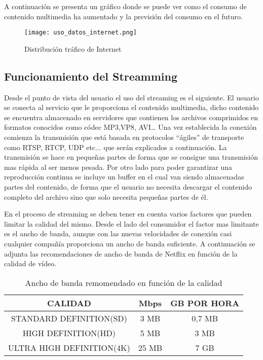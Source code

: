 A continuación se presenta un gráfico donde se puede ver como el consumo de contenido multimedia ha aumentado y la previsión del consumo en el futuro.

\begin{figure}[H]
    \centering
    \texttt{[image: uso\_datos\_internet.png]}
    \caption{Distribución tráfico de Internet}
\end{figure}

\subsection{Funcionamiento del Streamming}

Desde el punto de vista del usuario el uso del streaming es el siguiente. El usuario se conecta al servicio que le proporciona el contenido multimedia, dicho contenido se encuentra almacenado en servidores que contienen los archivos comprimidos en formatos conocidos como códec  MP3,VP8, AVI… Una vez establecida la conexión comienza la transmisión que está basada en protocolos “ágiles” de transporte como RTSP, RTCP, UDP etc... que serán explicados a continuación. La transmisión se hace en pequeñas partes de forma que se consigue una transmisión mas rápida al ser menos pesada. Por otro lado para poder garantizar una reproducción continua se incluye un buffer en el cual van siendo almacenadas partes del contenido, de forma que el usuario no necesita descargar el contenido completo del archivo sino que solo necesita pequeñas partes de él. 

En el proceso de streaming se deben tener en cuenta varios factores que pueden limitar la calidad del mismo. Desde el lado del consumidor el factor mas limitante es el ancho de banda, aunque con las nuevas velocidades de conexión casi cualquier compañía proporciona un ancho de banda suficiente. A continuación se adjunta las recomendaciones de ancho de banda de Netflix en función de la calidad de vídeo.

\begin{table}[H]
\centering
\begin{tabular}{|c|c|c|}
\hline
 CALIDAD & Mbps & GB POR HORA \\
\hline
STANDARD DEFINITION(SD) & 3 MB & 0,7 MB \\
\hline
HIGH DEFINITION(HD) & 5 MB & 3 MB \\
\hline
ULTRA HIGH DEFINITION(4K) & 25 MB & 7 GB \\
\hline
\end{tabular}
\caption{Ancho de banda remomendado en función de la calidad}
\end{table}

